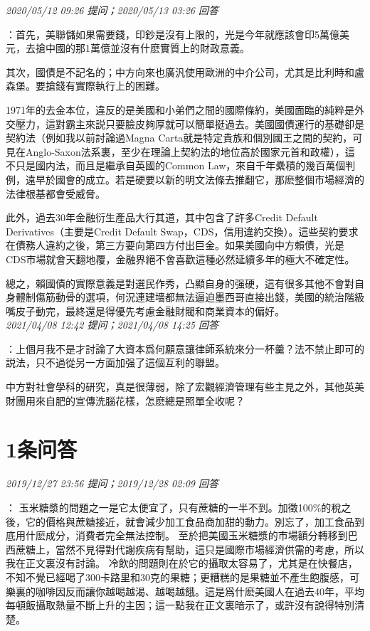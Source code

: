 \documentclass[twocolumn]{ctexart}
\begin{document}
\textit{\hfill\noindent\small 2020/05/12 09:26 提问；2020/05/13 03:26 回答}

：首先，美聯儲如果需要錢，印鈔是沒有上限的，光是今年就應該會印5萬億美元，去搶中國的那1萬億並沒有什麽實質上的財政意義。

其次，國債是不記名的；中方向來也廣汎使用歐洲的中介公司，尤其是比利時和盧森堡。要搶錢有實際執行上的困難。

1971年的去金本位，違反的是美國和小弟們之間的國際條約，美國面臨的純粹是外交壓力，這對霸主來説只要臉皮夠厚就可以簡單挺過去。美國國債運行的基礎卻是契約法（例如我以前討論過Magna Carta就是特定貴族和個別國王之間的契約，可見在Anglo-Saxon法系裏，至少在理論上契約法的地位高於國家元首和政權），這不只是國内法，而且是繼承自英國的Common Law，來自千年纍積的幾百萬個判例，遠早於國會的成立。若是硬要以新的明文法條去推翻它，那麽整個市場經濟的法律根基都會受威脅。

此外，過去30年金融衍生產品大行其道，其中包含了許多Credit Default Derivatives（主要是Credit Default Swap，CDS，信用違約交換）。這些契約要求在債務人違約之後，第三方要向第四方付出巨金。如果美國向中方賴債，光是CDS市場就會天翻地覆，金融界絕不會喜歡這種必然延續多年的極大不確定性。

總之，賴國債的實際意義是對選民作秀，凸顯自身的强硬，這有很多其他不會對自身體制傷筋動骨的選項，何況連建墻都無法逼迫墨西哥直接出錢，美國的統治階級嘴皮子動完，最終還是得優先考慮金融財閥和商業資本的偏好。
\\

\textit{\hfill\noindent\small 2021/04/08 12:42 提问；2021/04/08 14:25 回答}

：上個月我不是才討論了大資本爲何願意讓律師系統來分一杯羹？法不禁止即可的説法，只不過從另一方面加强了這個互利的聯盟。

中方對社會學科的研究，真是很薄弱，除了宏觀經濟管理有些主見之外，其他英美財團用來自肥的宣傳洗腦花樣，怎麽總是照單全收呢？
\\

\section{1条问答}

\textit{\hfill\noindent\small 2019/12/27 23:56 提问；2019/12/28 02:09 回答}

：
玉米糖漿的問題之一是它太便宜了，只有蔗糖的一半不到。加徵100\%的稅之後，它的價格與蔗糖接近，就會減少加工食品商加甜的動力。別忘了，加工食品到底用什麽成分，消費者完全無法控制。 
至於把美國玉米糖漿的市場額分轉移到巴西蔗糖上，當然不見得對代謝疾病有幫助，這只是國際市場經濟供需的考慮，所以我在正文裏沒有討論。 
冷飲的問題則在於它的攝取太容易了，尤其是在快餐店，不知不覺已經喝了300卡路里和30克的果糖；更糟糕的是果糖並不產生飽腹感，可樂裏的咖啡因反而讓你越喝越渴、越喝越餓。這是爲什麽美國人在過去40年，平均每頓飯攝取熱量不斷上升的主因；這一點我在正文裏暗示了，或許沒有說得特別清楚。
\\
\end{document}
